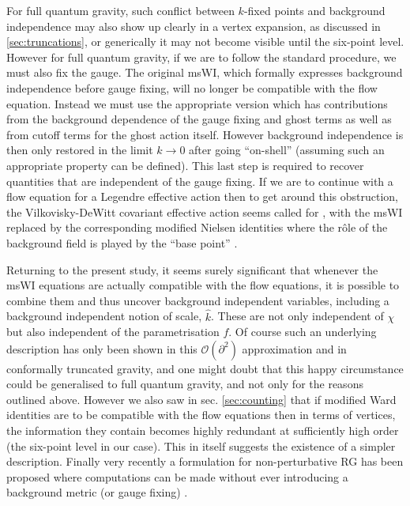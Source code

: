 \documentclass[11pt]{book} %
\newcommand{\hk}{\hat k}
\begin{document}
For full quantum gravity, such conflict between $k$-fixed points and background independence may also show up clearly in a vertex expansion, as discussed in \ref{sec:truncations}, or generically it may not become visible until the six-point level. However for full quantum gravity, if we are to follow the standard procedure, we must also fix the gauge. The original msWI, which formally expresses background independence before gauge fixing, will no longer be compatible with the flow equation. Instead we must use the appropriate version which has  contributions from the background dependence of the gauge fixing and ghost terms as well as from cutoff terms for the ghost action itself. However background independence is then only restored in the limit $k\to0$ after going ``on-shell'' (assuming such an appropriate property can be defined). This last step is required to recover quantities that are independent of the gauge fixing. If we are to continue with a flow equation for a Legendre effective action \cite{Wetterich:1992yh,Morris:1993qb} then to get around this obstruction, the Vilkovisky-DeWitt covariant effective action seems called for \cite{Branchina:2003ek,Donkin:2012ud,Demmel:2014hla,Safari:2015dva}, with the msWI replaced by the corresponding modified Nielsen identities where the r\^ole of the background field is played by the ``base point'' \cite{Pawlowski:2003sk}.

Returning to the present study, it seems surely significant that
whenever the msWI equations  are actually compatible with the flow equations, it is possible to combine them and thus uncover background independent variables, including a background independent notion of scale, $\hk$. These are not only independent of $\chi$ but also independent of the parametrisation $f$. Of course such an underlying description has only been shown in this $\mathcal{O}(\partial^2)$ approximation and in conformally truncated gravity, and one might doubt that this happy circumstance could be generalised to full quantum gravity, and not only for the reasons outlined above. However we also saw in sec. \ref{sec:counting} that if modified Ward identities are to be compatible with the flow equations then in terms of vertices, the information they contain becomes highly redundant at sufficiently high order (the six-point level in our case). This in itself suggests the existence of a simpler description. Finally very recently a formulation for non-perturbative RG has been proposed where computations can be made without ever introducing a background metric (or gauge fixing) \cite{Morris:2016nda}.
\end{document}
